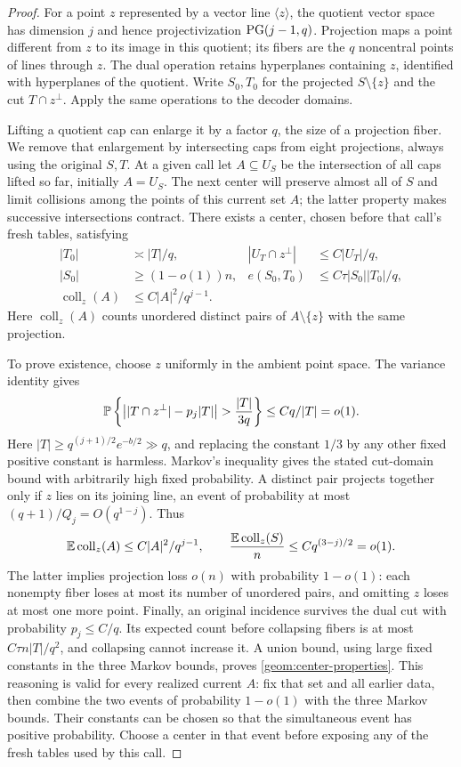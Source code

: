 \begin{proof}
For a point $z$ represented by a vector line $\langle z\rangle$, the
quotient vector space has dimension $j$ and hence projectivization
$\operatorname{PG}(j-1,q)$. Projection maps a point different from $z$ to its
image in this quotient; its fibers are the $q$ noncentral points of
lines through $z$. The dual operation retains hyperplanes containing
$z$, identified with hyperplanes of the quotient. Write $S_0,T_0$ for
the projected $S\setminus\{z\}$ and the cut $T\cap z^\perp$.
Apply the same operations to the decoder domains.

Lifting a quotient cap can enlarge it by a factor $q$, the size of a
projection fiber. We remove that enlargement by intersecting caps from
eight projections, always using the original $S,T$. At a given call let
$A\subseteq U_S$ be the intersection of all caps lifted so far, initially
$A=U_S$. The next center will preserve almost all of $S$ and limit
collisions among the points of this current set $A$; the latter property
makes successive intersections contract.
There exists a center, chosen before that
call's fresh tables, satisfying
\begin{equation}\label{geom:center-properties}
 \begin{aligned}
 |T_0|&\asymp |T|/q,&
 |U_T\cap z^\perp|&\leq C|U_T|/q,\\
 |S_0|&\geq(1-o(1))n,&
 e(S_0,T_0)&\leq C\tau |S_0||T_0|/q,\\
 \operatorname{coll}_z(A)&\leq C|A|^2/q^{j-1}.&&
 \end{aligned}
\end{equation}
Here $\operatorname{coll}_z(A)$ counts unordered distinct pairs of
$A\setminus\{z\}$ with the same projection.

To prove existence, choose $z$ uniformly in the ambient point space.
The variance identity gives
\[
 \mathbb P\left\{\left||T\cap z^\perp|-p_j|T|\right|
                >\frac{|T|}{3q}\right\}
 \leq Cq/|T|=o(1).
\]
Here $|T|\geq q^{(j+1)/2}e^{-b/2}\gg q$, and replacing the constant
$1/3$ by any other fixed positive constant is harmless. Markov's
inequality gives the stated cut-domain bound with arbitrarily high
fixed probability. A distinct pair projects together only if $z$ lies
on its joining line, an event of probability at most
$(q+1)/Q_j=O(q^{1-j})$. Thus
\[
 \mathbb E\operatorname{coll}_z(A)\leq C|A|^2/q^{j-1},\qquad
 \frac{\mathbb E\operatorname{coll}_z(S)}{n}
 \leq Cq^{(3-j)/2}=o(1).
\]
The latter implies projection loss $o(n)$ with probability $1-o(1)$:
each nonempty fiber loses at most its number of unordered pairs, and
omitting $z$ loses at most one more point. Finally, an original
incidence survives the dual cut with probability $p_j\leq C/q$.
Its expected count before collapsing fibers is at most
$C\tau n|T|/q^2$, and collapsing cannot increase it. A union bound,
using large fixed constants in the three Markov bounds, proves
\eqref{geom:center-properties}. This reasoning is valid for every
realized current $A$: fix that set and all earlier data, then combine
the two events of probability $1-o(1)$ with the three Markov bounds.
Their constants can be chosen so that the simultaneous event has
positive probability. Choose a center in that event before exposing
any of the fresh tables used by this call.


\end{proof}
